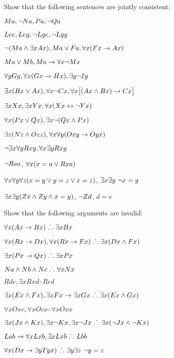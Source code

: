 \problempart
Show that the following sentences are jointly consistent:
\begin{earg}
\item $Ma, \neg Na, Pa, \neg Qa$
\item $Lee, Leg, \neg Lge, \neg Lgg$
\item $\neg (Ma \wedge \exists x Ax), Ma \vee Fa, \forall x(Fx \rightarrow Ax)$
\item $Ma \vee Mb, Ma \rightarrow \forall x \neg Mx$
\item $\forall y Gy, \forall x (Gx \rightarrow Hx), \exists y \neg Iy$
\item $\exists x(Bx \vee Ax), \forall x \neg Cx, \forall x\bigl[(Ax \wedge Bx) \rightarrow Cx\bigr]$
\item $\exists x Xx, \exists x Yx, \forall x(Xx \leftrightarrow \neg Yx)$
\item $\forall x(Px \vee Qx), \exists x\neg(Qx \wedge Px)$
\item $\exists z(Nz \wedge Ozz), \forall x\forall y(Oxy \rightarrow Oyx)$
\item $\neg \exists x \forall y Rxy, \forall x \exists y Rxy$
\item $\neg Raa$, $\forall x (x=a \vee Rxa)$
\item $\forall x\forall y\forall z(x=y \vee y=z \vee x=z)$, $\exists x\exists y\ \neg x= y$
\item $\exists x\exists y(Zx \wedge Zy \wedge x=y)$, $\neg Zd$, $d=e$
\end{earg}

\problempart
Show that the following arguments are invalid:
\begin{earg}
\item $\forall x(Ax \rightarrow Bx) \mathrel{\ldotp\dot{}\,\ldotp} \exists x Bx$
\item $\forall x(Rx \rightarrow Dx), \forall x(Rx \rightarrow Fx) \mathrel{\ldotp\dot{}\,\ldotp} \exists x(Dx \wedge Fx)$
\item $\exists x(Px\rightarrow Qx) \mathrel{\ldotp\dot{}\,\ldotp} \exists x Px$
\item $Na \wedge Nb \wedge Nc \mathrel{\ldotp\dot{}\,\ldotp} \forall x Nx$
\item $Rde, \exists x Rxd \therefore Red$
\item $\exists x(Ex \wedge Fx), \exists x Fx \rightarrow \exists x Gx \mathrel{\ldotp\dot{}\,\ldotp} \exists x(Ex \wedge Gx)$
\item $\forall x Oxc, \forall x Ocx \therefore \forall x Oxx$
\item $\exists x(Jx \wedge Kx), \exists x \neg Kx, \exists x \neg Jx \mathrel{\ldotp\dot{}\,\ldotp} \exists x(\neg Jx \wedge \neg Kx)$
\item $Lab \rightarrow \forall x Lxb, \exists x Lxb \mathrel{\ldotp\dot{}\,\ldotp} Lbb$
\item $\forall x(Dx \rightarrow \exists y Tyx) \mathrel{\ldotp\dot{}\,\ldotp} \exists y \exists z\ \neg y= z$
\end{earg}

